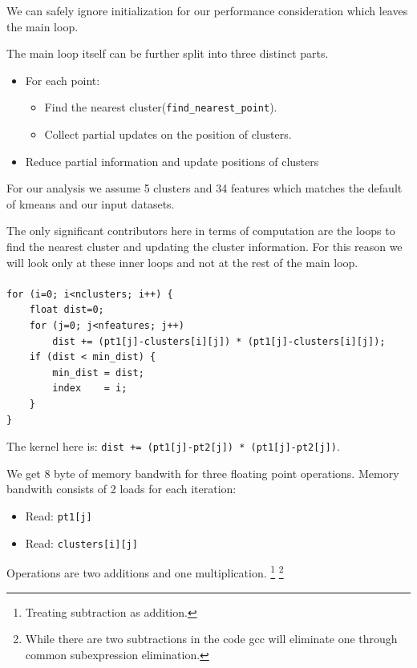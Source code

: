 We can safely ignore initialization for our performance consideration which leaves the main loop.

The main loop itself can be further split into three distinct parts.
\begin{itemize}
	\item For each point:
	\begin{itemize}
		\item Find the nearest cluster(\texttt{find\_nearest\_point}).
		\item Collect partial updates on the position of clusters.
	\end{itemize}
	\item Reduce partial information and update positions of clusters 	
\end{itemize}

For our analysis we assume 5 clusters and 34 features which matches
the default of kmeans and our input datasets.

The only significant contributors here in terms of computation are the loops to find the nearest cluster and updating the cluster information.
For this reason we will look only at these inner loops and not at the rest of the main loop.

\paragraph{}
\begin{lstlisting}[caption={Inlined representation of find\_nearest\_point}]
for (i=0; i<nclusters; i++) {
	float dist=0;
	for (j=0; j<nfeatures; j++)
		dist += (pt1[j]-clusters[i][j]) * (pt1[j]-clusters[i][j]);
	if (dist < min_dist) {
		min_dist = dist;
		index    = i;
	}
}
\end{lstlisting}
The kernel here is:
\texttt{dist += (pt1[j]-pt2[j]) * (pt1[j]-pt2[j])}.\newline

We get 8 byte of memory bandwith for three floating point operations.
Memory bandwith consists of 2 loads for each iteration:
\begin{itemize}
	\item Read: \texttt{pt1[j]}
	\item Read: \texttt{clusters[i][j]}
\end{itemize}
Operations are two additions and one multiplication.
\footnote{Treating subtraction as addition.}
\footnote{While there are two subtractions in the code gcc will eliminate one through common subexpression elimination.}


